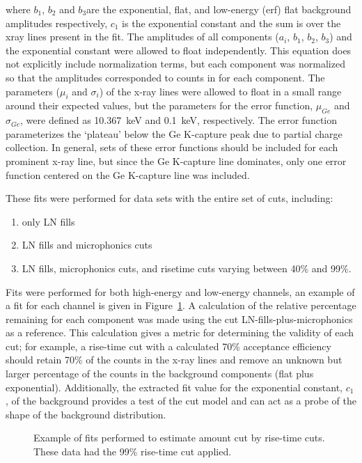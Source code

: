 where $b_{1}$, $b_{2}$ and $b_{3}$are the exponential, flat, and low-energy (erf) flat background amplitudes respectively, $c_{1}$ is the exponential constant and the sum is over the xray lines present in the fit.  The amplitudes of all components ($a_{i}$, $b_{1}$, $b_{2}$, $b_{3}$) and the exponential constant were allowed to float independently.  This equation does not explicitly include normalization terms, but each component was normalized so that the amplitudes corresponded to counts in for each component.  The parameters ($\mu_{i}$ and $\sigma_{i}$) of the x-ray lines were allowed to float in a small range around their expected values, but the parameters for the error function, $\mu_{Ge}$ and $\sigma_{Ge}$, were defined as 10.367~keV and 0.1~keV, respectively.  The error function parameterizes the `plateau' below the Ge K-capture peak due to partial charge collection.  In general, sets of these error functions should be included for each prominent x-ray line, but since the Ge K-capture line dominates, only one error function centered on the Ge K-capture line was included.

These fits were performed for data sets with the entire set of cuts, including:

					\begin{enumerate}
						\item only LN fills
						\item LN fills and microphonics cuts
						\item LN fills, microphonics cuts, and risetime cuts varying between 40\% and 99\%.
					\end{enumerate}

Fits were performed for both high-energy and low-energy channels, an example of a fit for each channel is given in Figure~\ref{fig:BeGeFitExample}.  A calculation of the relative percentage remaining for each component was made using the cut LN-fills-plus-microphonics as a reference.  This calculation gives a metric for determining the validity of each cut; for example, a rise-time cut with a calculated 70\% acceptance efficiency should retain 70\% of the counts in the x-ray lines and remove an unknown but larger percentage of the counts in the background components (flat plus exponential).  Additionally, the extracted fit value for the exponential constant, $c_{1}$, of the background provides a test of the cut model and can act as a probe of the shape of the background distribution.  
	
					\begin{figure}
						\centering
						
						\caption[Example of fits performed to estimate amount cut by rise-time cuts]
						{Example of fits performed to estimate amount cut by rise-time cuts.  These data had the 99\% rise-time cut applied.}
						\label{fig:BeGeFitExample}
					\end{figure}
	
